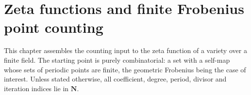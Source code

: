 %

\chapter{Zeta functions and finite Frobenius point counting}
\label{chap:weil-zeta-point-counting}

This chapter assembles the counting input to the zeta function of a variety
over a finite field.  The starting point is purely combinatorial: a set with a
self-map whose sets of periodic points are finite, the geometric Frobenius
being the case of interest.  Unless stated otherwise, all coefficient, degree,
period, divisor and iteration indices lie in $\mathbf N$.



